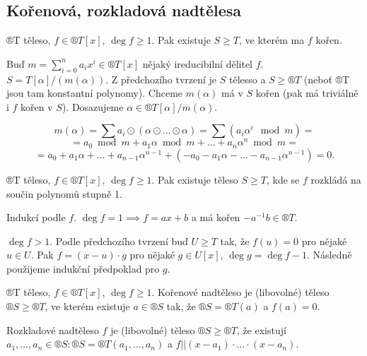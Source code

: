 \documentclass[12pt]{article}                   %
\begin{document}
    \subsection{Kořenová, rozkladová nadtělesa}
        \begin{tvrzeni}
            ®T těleso, $f \in ®T[x]$, $\deg f ≥ 1$. Pak existuje $S ≥ T$, ve kterém ma $f$ kořen.

            \begin{dukazin}
                Buď $m = \sum_{i=0}^n a_ix^i \in ®T[x]$ nějaký ireducibilní dělitel $f$. $S = T[\alpha] / (m(\alpha))$. Z předchozího tvrzení je $S$ tělesso a $S ≥ ®T$ (neboť ®T jsou tam konstantní polynomy). Chceme $m(\alpha)$ má v $S$ kořen (pak má triviálně i $f$ kořen v $S$). Dosazujeme $\alpha \in ®T[\alpha]/m(\alpha)$.

                $$ m(\alpha) = \sum a_i \odot (\alpha \odot … \odot \alpha) = \sum(a_i \alpha^i \mod m) = $$
                $$ = a_0 \bmod m + a_1\alpha \bmod m + … + a_n \alpha^n \bmod m = $$
                $$ = a_0 + a_1\alpha  + … + a_{n-1} \alpha^{n-1} + (- a_0 - a_1 \alpha - … - a_{n-1}\alpha^{n-1}) = 0. $$ 
            \end{dukazin}
        \end{tvrzeni}

        \begin{veta}
            ®T těleso, $f \in ®T[x]$, $\deg f ≥ 1$. Pak existuje těleso $S ≥ T$, kde se $f$ rozkládá na součin polynomů stupně 1.

            \begin{dukazin}
                Indukcí podle $f$. $\deg f = 1 \implies f = ax + b$ a má kořen $-a^{-1}b \in ®T$.

                $\deg f > 1$. Podle předchozího tvrzení buď $U ≥ T$ tak, že $f(u) = 0$ pro nějaké $u \in U$. Pak $f = (x - u)·g$ pro nějaké $g \in U[x]$, $\deg g = \deg f - 1$. Následně použijeme indukční předpoklad pro $g$.
            \end{dukazin}
        \end{veta}

        \begin{definice}
            ®T těleso, $f \in ®T[x]$, $\deg f ≥ 1$. Kořenové nadtěleso je (libovolné) těleso $®S ≥ ®T$, ve kterém existuje $a \in ®S$ tak, že $®S = ®T(a)$ a $f(a) = 0$.

            Rozkladové nadtěleso $f$ je (libovolné) těleso $®S ≥ ®T$, že existují $a_1, …, a_n \in ®S: ®S = ®T(a_1, …, a_n)$ a $f||(x - a_1)·…·(x - a_n)$.
        \end{definice}
\end{document}
